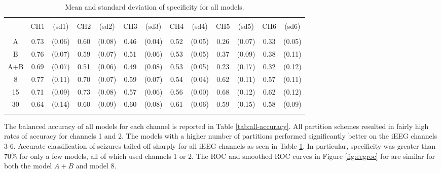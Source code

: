 \begin{table}[!htbp] \centering 
\begin{tabular}{@{\extracolsep{-5pt}} ccccccccccccc} 
\\[-1.8ex]\hline 
\hline \\[-1.8ex] 
 & CH1 & (sd1) & CH2 & (sd2) & CH3 & (sd3) & CH4 & (sd4) & CH5 & (sd5) & CH6 & (sd6) \\ 
\hline \\[-1.8ex] 
A & 0.73 & (0.06) & 0.60 & (0.08) & 0.46 & (0.04) & 0.52 & (0.05) & 0.26 & (0.07) & 0.33 & (0.05) \\ 
B & 0.76 & (0.07) & 0.59 & (0.07) & 0.51 & (0.06) & 0.53 & (0.05) & 0.37 & (0.09) & 0.38 & (0.11) \\ 
A+B & 0.69 & (0.07) & 0.51 & (0.06) & 0.49 & (0.08) & 0.53 & (0.05) & 0.23 & (0.17) & 0.32 & (0.12) \\ 
8 & 0.77 & (0.11) & 0.70 & (0.07) & 0.59 & (0.07) & 0.54 & (0.04) & 0.62 & (0.11) & 0.57 & (0.11) \\ 
15 & 0.71 & (0.09) & 0.73 & (0.08) & 0.57 & (0.06) & 0.56 & (0.00) & 0.68 & (0.12) & 0.62 & (0.12) \\ 
30 & 0.64 & (0.14) & 0.60 & (0.09) & 0.60& (0.08) & 0.61 & (0.06) & 0.59 & (0.15) & 0.58 & (0.09) \\ 
\hline \\[-1.8ex] 
\end{tabular} 
  \caption{Mean and standard deviation of specificity for all models.} 
  \label{tab:all-specificity} 
\end{table}


The balanced accuracy of all models for each channel is
reported in Table \ref{tab:all-accuracy}. All partition
schemes resulted in fairly high rates of accuracy for channels 1 and 2. The models with a higher number of 
partitions performed significantly better on the 
iEEG channels 3-6. Accurate classification of seizures tailed off sharply for all iEEG channels as seen in Table \ref{tab:all-specificity}. In particular, specificity was greater than 70\% for only 
a few models, all of which used channels 1 or 2. The ROC and smoothed ROC curves in Figure \ref{fig:eegroc}
for are similar for both the model $A + B$ and model $8$. 



